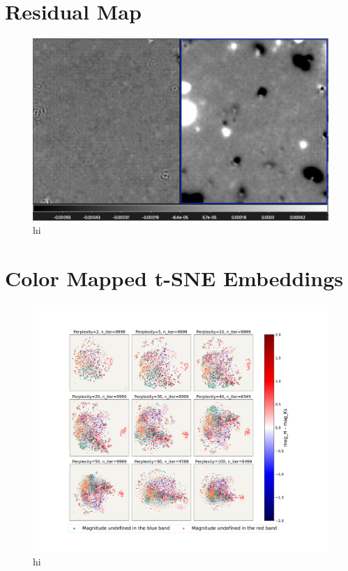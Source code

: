 \section{Residual Map}

\begin{figure}[h!]
    \centering
    \includegraphics[scale=0.5]{Code/Saved_Figures/comparing_residual_maps}
    \caption{hi}
    \label{Comparing_residual_maps}
\end{figure}

\newpage
\section{Color Mapped t-SNE Embeddings}

\begin{figure}[h!]
    \centering
    \includegraphics[trim={5cm 3cm 5cm 3cm},clip,width=\textwidth]{Code/Saved_Figures/peplex_H_Ks.pdf}
    \caption{hi}
    \label{embeddding_H_ks}
\end{figure}

